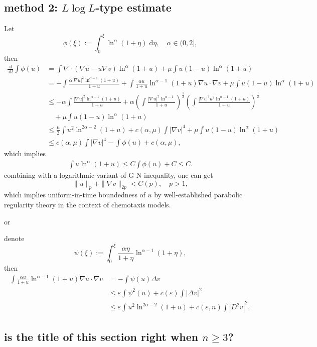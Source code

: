 \documentclass[en,hazy,screen,blue,14pt]{elegantnote}
\numberwithin{dummy}{section}
\newcommand{\dd}{\;\mathrm{d}}
\begin{document}
\subsection{method 2: \texorpdfstring{$L\log L$}{LlogL}-type estimate}
Let 
\[
	\phi(\xi) := \int_0^\xi \ln^\alpha(1+\eta) \dd\eta,\quad\alpha \in (0,2],
\]
then
\begin{align*}
	\frac{\dd}{\dd t}\int\phi(u)
	&= \int \nabla\cdot(\nabla u - u\nabla v) \ln^\alpha(1+u) + \mu\int u(1-u)\ln^\alpha(1+u)\\
	&= - \int \frac{\alpha|\nabla u|^2\ln^{\alpha-1}(1+u)}{1+u}
		+ \int \frac{\alpha u}{1+u} \ln^{\alpha-1}(1+u)\nabla u\cdot\nabla v  + \mu\int u(1-u)\ln^\alpha(1+u)\\
	&\leq - \alpha \int \frac{|\nabla u|^2\ln^{\alpha-1}(1+u)}{1+u}
		+ \alpha\left(\int \frac{|\nabla u|^2\ln^{\alpha-1}}{1+u}\right)^{\frac12}
			\left(\int \frac{|\nabla v|^2u^2\ln^{\alpha-1}(1+u)}{1+u}\right)^{\frac12}\\
	&\quad + \mu\int u(1-u)\ln^\alpha(1+u)\\
	&\leq \frac{\mu}{2}\int u^2\ln^{2\alpha-2}(1+u) + c(\alpha, \mu)\int|\nabla v|^4 
		+ \mu\int u(1-u)\ln^\alpha(1+u)\\
	&\leq c(\alpha, \mu)\int|\nabla v|^4 - \int\phi(u) + c(\alpha, \mu),
\end{align*}
which implies
\begin{align*}
	\int u\ln^\alpha(1+u) \leq C\int \phi(u) + C \leq C.
\end{align*}
combining with a logarithmic variant of G-N inequality, one can get 
\[
	\|u\|_p + \|\nabla v\|_{2p} < C(p), \quad p>1,
\]
which implies uniform-in-time boundedness of $u$ 
by well-established parabolic regularity theory in the context of chemotaxis models.

or

denote 
\[
	\psi(\xi) := \int_0^\xi \frac{\alpha \eta}{1+\eta}\ln^{\alpha-1}(1+\eta),
\]
then 
\begin{align*}
	\int \frac{\alpha u}{1+u} \ln^{\alpha-1}(1+u)\nabla u\cdot\nabla v
	&= - \int \psi(u) \Delta v\\
	&\leq \varepsilon\int \psi^2(u) + c(\varepsilon)\int |\Delta v|^2\\
	&\leq \varepsilon \int u^2\ln^{2\alpha -2}(1+u) + c(\varepsilon, n) \int |D^2 v|^2,
\end{align*}


\subsection{is the title of this section right when \texorpdfstring{$n\geq3$}{n>=3}?}
\end{document}
